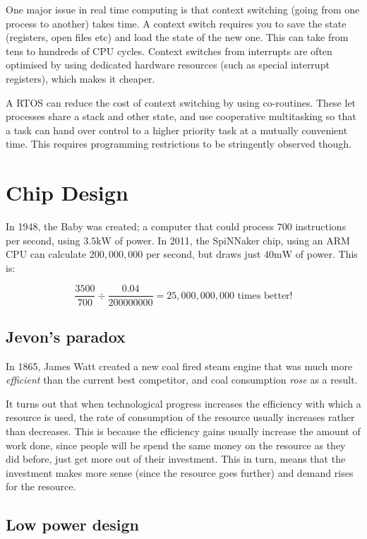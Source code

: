 One major issue in real time computing is that context switching (going from one
process to another) takes time. A context switch requires you to save the state
(registers, open files etc) and load the state of the new one. This can take
from tens to hundreds of CPU cycles. Context switches from interrupts are often
optimised by using dedicated hardware resources (such as special interrupt
registers), which makes it cheaper.

A RTOS can reduce the cost of context switching by using co-routines. These let
processes share a stack and other state, and use cooperative multitasking so
that a task can hand over control to a higher priority task at a mutually
convenient time. This requires programming restrictions to be stringently
observed though.

\section{Chip Design}

In 1948, the Baby was created; a computer that could process $700$ instructions
per second, using $3.5\si{\kilo\watt}$ of power. In 2011, the SpiNNaker chip,
using an ARM CPU can calculate $200,000,000$ per second, but draws just
$40\si{\milli\watt}$ of power. This is:

\[
  \frac{3500}{700} \div \frac{0.04}{200000000} = 25,000,000,000 \text{~times better!}
\]

\subsection{Jevon's paradox}

In 1865, James Watt created a new coal fired steam engine that was much more
\textit{efficient} than the current best competitor, and coal consumption
\textit{rose} as a result.

It turns out that when technological progress increases the efficiency with
which a resource is used, the rate of consumption of the resource usually
increases rather than decreases. This is because the efficiency gains usually
increase the amount of work done, since people will be spend the same money on
the resource as they did before, just get more out of their investment. This in
turn, means that the investment makes more sense (since the resource goes
further) and demand rises for the resource.

\subsection{Low power design}

